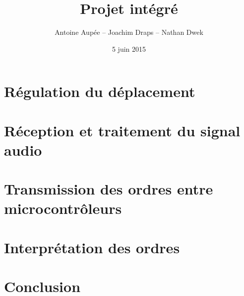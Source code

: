 \documentclass[frenchb,14pt]{beamer}
\title{Projet intégré}
\author{Antoine Aupée -- Joachim Draps -- Nathan Dwek}
\date{5 juin 2015}
\begin{document}
\frame{\titlepage}


\section{Régulation du déplacement}

\section{Réception et traitement du signal audio}

\section{Transmission des ordres entre microcontrôleurs}
%
\section{Interprétation des ordres}
%
\section{Conclusion}

\end{document}
